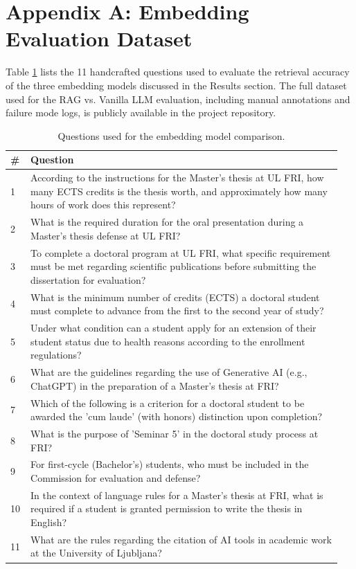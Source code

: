 \documentclass[fleqn,moreauthors,10pt]{ds_report}
\begin{document}
\section*{Appendix A: Embedding Evaluation Dataset}
\label{app:embedding_dataset}

Table \ref{tab:appendix_questions} lists the 11 handcrafted questions used to evaluate the retrieval accuracy of the three embedding models discussed in the Results section. The full dataset used for the RAG vs. Vanilla LLM evaluation, including manual annotations and failure mode logs, is publicly available in the project repository.

\begin{table}[H]
    \caption{Questions used for the embedding model comparison.}
    \centering
    \begin{tabular}{p{0.05\linewidth} p{0.9\linewidth}}
        \toprule
        \textbf{\#} & \textbf{Question} \\
        \midrule
        1 & According to the instructions for the Master's thesis at UL FRI, how many ECTS credits is the thesis worth, and approximately how many hours of work does this represent? \\
        2 & What is the required duration for the oral presentation during a Master's thesis defense at UL FRI? \\
        3 & To complete a doctoral program at UL FRI, what specific requirement must be met regarding scientific publications before submitting the dissertation for evaluation? \\
        4 & What is the minimum number of credits (ECTS) a doctoral student must complete to advance from the first to the second year of study? \\
        5 & Under what condition can a student apply for an extension of their student status due to health reasons according to the enrollment regulations? \\
        6 & What are the guidelines regarding the use of Generative AI (e.g., ChatGPT) in the preparation of a Master's thesis at FRI? \\
        7 & Which of the following is a criterion for a doctoral student to be awarded the 'cum laude' (with honors) distinction upon completion? \\
        8 & What is the purpose of 'Seminar 5' in the doctoral study process at FRI? \\
        9 & For first-cycle (Bachelor's) students, who must be included in the Commission for evaluation and defense? \\
        10 & In the context of language rules for a Master's thesis at FRI, what is required if a student is granted permission to write the thesis in English? \\
        11 & What are the rules regarding the citation of AI tools in academic work at the University of Ljubljana? \\
        \bottomrule
    \end{tabular}
    \label{tab:appendix_questions}
\end{table}
\end{document}
